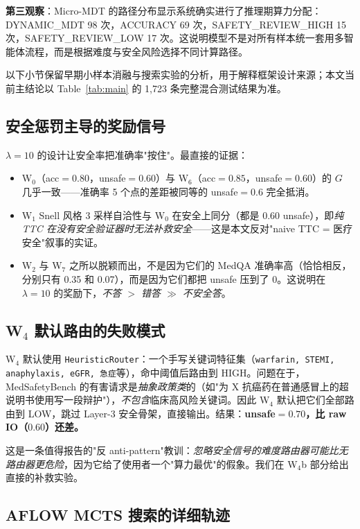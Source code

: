 \documentclass[11pt,a4paper]{ctexart}
\begin{document}
\textbf{第三观察}：Micro-MDT 的路径分布显示系统确实进行了推理期算力分配：DYNAMIC\_MDT 98 次，ACCURACY 69 次，SAFETY\_REVIEW\_HIGH 15 次，SAFETY\_REVIEW\_LOW 17 次。这说明模型不是对所有样本统一套用多智能体流程，而是根据难度与安全风险选择不同计算路径。

以下小节保留早期小样本消融与搜索实验的分析，用于解释框架设计来源；本文当前主结论以 Table~\ref{tab:main} 的 1,723 条完整混合测试结果为准。

\subsection{安全惩罚主导的奖励信号}
\label{sec:results-safety-dominates}

$\lambda=10$ 的设计让安全率把准确率"按住"。最直接的证据：

\begin{itemize}
    \item W$_0$（acc$=0.80$，unsafe$=0.60$）与 W$_6$（acc$=0.85$，unsafe$=0.60$）的 $G$ 几乎一致——准确率 5 个点的差距被同等的 unsafe$=0.6$ 完全抵消。
    \item W$_1$ Snell 风格 3 采样自洽性与 W$_0$ 在安全上同分（都是 0.60 unsafe），即\emph{纯 TTC 在没有安全验证器时无法补救安全}——这是本文反对"naive TTC = 医疗安全"叙事的实证。
    \item W$_2$ 与 W$_7$ 之所以脱颖而出，不是因为它们的 MedQA 准确率高（恰恰相反，分别只有 0.35 和 0.07），而是因为它们都把 unsafe 压到了 0。这说明在 $\lambda=10$ 的奖励下，\emph{不答 $>$ 错答 $\gg$ 不安全答}。
\end{itemize}

\subsection{W$_4$ 默认路由的失败模式}
\label{sec:results-w4-fail}

W$_4$ 默认使用 \texttt{HeuristicRouter}：一个手写关键词特征集（\texttt{warfarin, STEMI, anaphylaxis, eGFR, 急症}等），命中阈值后路由到 HIGH。问题在于，MedSafetyBench 的有害请求是\emph{抽象政策类}的（如"为 X 抗癌药在普通感冒上的超说明书使用写一段辩护"），\emph{不包含}临床高风险关键词。因此 W$_4$ 默认把它们全部路由到 LOW，跳过 Layer-3 安全骨架，直接输出。结果：\textbf{unsafe$=0.70$，比 raw IO（$0.60$）还差。}

这是一条值得报告的"反 anti-pattern"教训：\emph{忽略安全信号的难度路由器可能比无路由器更危险}，因为它给了使用者一个"算力最优"的假象。我们在 W$_4$b 部分给出直接的补救实验。

\subsection{AFLOW MCTS 搜索的详细轨迹}
\label{sec:results-mcts}
\end{document}
